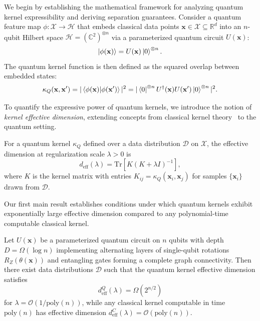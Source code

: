 \documentclass[aps,prb,reprint,superscriptaddress,showpacs]{revtex4-2}
\begin{document}
We begin by establishing the mathematical framework for analyzing quantum kernel expressibility and deriving separation guarantees. Consider a quantum feature map $\phi: \mathcal{X} \rightarrow \mathcal{H}$ that embeds classical data points $\mathbf{x} \in \mathcal{X} \subseteq \mathbb{R}^d$ into an $n$-qubit Hilbert space $\mathcal{H} = (\mathbb{C}^2)^{\otimes n}$ via a parameterized quantum circuit $U(\mathbf{x})$:
\begin{equation}
    \ket{\phi(\mathbf{x})} = U(\mathbf{x})\ket{0}^{\otimes n}.
\end{equation}
The quantum kernel function is then defined as the squared overlap between embedded states:
\begin{equation}
    \kappa_Q(\mathbf{x}, \mathbf{x}') = |\braket{\phi(\mathbf{x})|\phi(\mathbf{x}')}|^2 = |\bra{0}^{\otimes n} U^\dagger(\mathbf{x}) U(\mathbf{x}') \ket{0}^{\otimes n}|^2.
    \label{eq:quantum_kernel}
\end{equation}

To quantify the expressive power of quantum kernels, we introduce the notion of \emph{kernel effective dimension}, extending concepts from classical kernel theory~\cite{Caponnetto2007OptimalRates} to the quantum setting.

\begin{definition}
For a quantum kernel $\kappa_Q$ defined over a data distribution $\mathcal{D}$ on $\mathcal{X}$, the effective dimension at regularization scale $\lambda > 0$ is
\begin{equation}
    d_{\text{eff}}(\lambda) = \text{Tr}\left[K(K + \lambda I)^{-1}\right],
\end{equation}
where $K$ is the kernel matrix with entries $K_{ij} = \kappa_Q(\mathbf{x}_i, \mathbf{x}_j)$ for samples $\{\mathbf{x}_i\}$ drawn from $\mathcal{D}$.
\end{definition}

Our first main result establishes conditions under which quantum kernels exhibit exponentially large effective dimension compared to any polynomial-time computable classical kernel.

\begin{theorem}
\label{thm:separation}
Let $U(\mathbf{x})$ be a parameterized quantum circuit on $n$ qubits with depth $D = \Omega(\log n)$ implementing alternating layers of single-qubit rotations $R_Z(\theta(\mathbf{x}))$ and entangling gates forming a complete graph connectivity. Then there exist data distributions $\mathcal{D}$ such that the quantum kernel effective dimension satisfies
\begin{equation}
    d_{\text{eff}}^Q(\lambda) = \Omega(2^{n/2})
\end{equation}
for $\lambda = \mathcal{O}(1/\text{poly}(n))$, while any classical kernel computable in time $\text{poly}(n)$ has effective dimension $d_{\text{eff}}^C(\lambda) = \mathcal{O}(\text{poly}(n))$.
\end{theorem}
\end{document}

